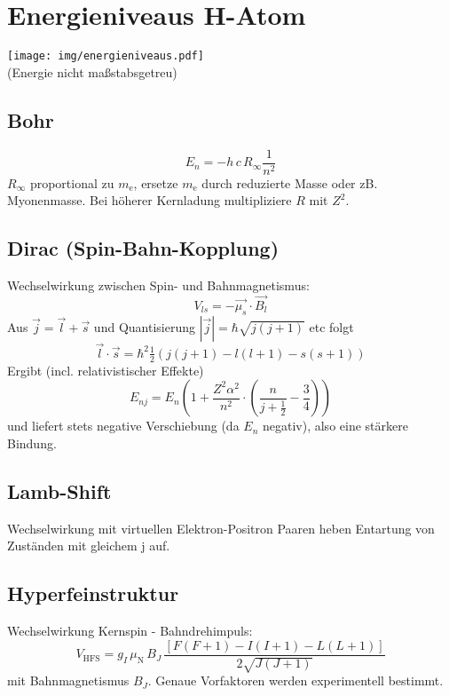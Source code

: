 \section{Energieniveaus H-Atom}
\begin{center}
	\texttt{[image: img/energieniveaus.pdf]}\\
	(Energie nicht maßstabsgetreu)
\end{center}

\subsection{Bohr}
\begin{equation*}
	E_n = -h \, c \, R_\infty \frac{1}{n^2}
\end{equation*}
$R_\infty$ proportional zu $m_\text{e}$, ersetze $m_\text{e}$ durch reduzierte Masse oder zB. Myonenmasse.
Bei höherer Kernladung multipliziere $R$ mit $Z^2$.

\subsection{Dirac (Spin-Bahn-Kopplung)}
Wechselwirkung zwischen Spin- und Bahnmagnetismus:
\begin{equation*}
	V_{ls} = -\vec{\mu_s} \cdot \vec{B_l}
\end{equation*}
Aus $\vec{j} = \vec{l} + \vec{s}$ und Quantisierung $|\vec{j}| = \hbar \sqrt{j(j+1)}$ etc folgt
\begin{equation*}
	\vec{l} \cdot \vec{s} = \hbar^2 \tfrac{1}{2}\left(j(j+1)-l(l+1)-s(s+1)\right)
\end{equation*}
Ergibt (incl. relativistischer Effekte)
\begin{equation*}
	E_{nj} = E_n \left(1 + \frac{Z^2 \alpha^2}{n^2} \cdot \left(\frac{n}{j+\frac{1}{2}} - \frac{3}{4} \right)\right)
\end{equation*}
und liefert stets negative Verschiebung (da $E_n$ negativ), also eine stärkere Bindung.

\subsection{Lamb-Shift}
Wechselwirkung mit virtuellen Elektron-Positron Paaren heben Entartung von Zuständen mit gleichem j auf.

\subsection{Hyperfeinstruktur}
Wechselwirkung Kernspin - Bahndrehimpuls:
\begin{equation*}
	V_\text{HFS} = g_I \, \mu_\text{N} \, B_J \, \frac{\left[F(F+1)-I(I+1)-L(L+1)\right]}{2 \sqrt{J(J+1)}}
\end{equation*}
mit Bahnmagnetismus $B_J$.
Genaue Vorfaktoren werden experimentell bestimmt.
